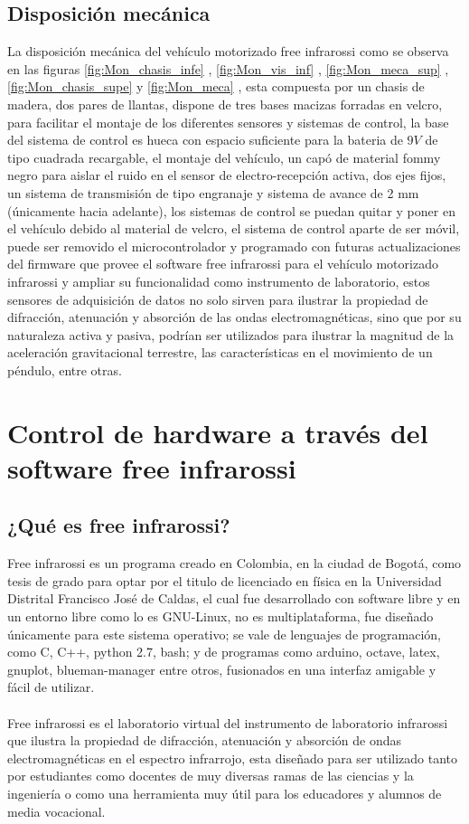 \documentclass[12]{article}
\begin{document}
\begin{multicols}{2}
\subsection{Disposición mecánica}
La disposición mecánica del vehículo motorizado free infrarossi como se observa en las figuras \ref{fig:Mon_chasis_infe} ,  \ref{fig:Mon_vis_inf} , \ref{fig:Mon_meca_sup} , \ref{fig:Mon_chasis_supe} y \ref{fig:Mon_meca} , esta compuesta por un chasis de madera, dos pares de llantas, dispone de tres bases macizas forradas en velcro, para facilitar el montaje de los diferentes sensores y sistemas de control, la base del sistema de control es hueca con espacio suficiente para la bateria de $9 V$ de tipo cuadrada recargable, el montaje del vehículo,  un capó de material fommy negro para aislar el ruido en el sensor de electro-recepción activa,  dos ejes fijos, un sistema de transmisión de tipo engranaje y sistema de avance de 2 mm (únicamente  hacia adelante), los sistemas de control se puedan quitar y poner en el vehículo debido al material de velcro, el sistema de control aparte de ser móvil, puede  ser removido el microcontrolador y programado con futuras actualizaciones del firmware que provee el software free infrarossi para el vehículo motorizado infrarossi y ampliar su funcionalidad como instrumento de laboratorio, estos sensores de adquisición de datos  no solo sirven para ilustrar la propiedad de difracción, atenuación y absorción de las ondas electromagnéticas, sino que por su naturaleza activa y pasiva, podrían ser utilizados para  ilustrar la magnitud de la  aceleración gravitacional terrestre, las características en el  movimiento de un péndulo, entre otras. 
\section{Control de hardware a través del software free infrarossi}
\subsection{¿Qué es free infrarossi?}
Free infrarossi es un  programa creado en Colombia, en la ciudad de Bogotá, como tesis de grado para optar por el titulo de licenciado en física en la Universidad Distrital Francisco José de Caldas, el cual fue desarrollado con software libre y en un entorno libre como lo es GNU-Linux, no es multiplataforma, fue diseñado únicamente para este sistema operativo; se vale de lenguajes de programación, como  C, C++, python 2.7, bash; y de programas como arduino, octave, latex, gnuplot, blueman-manager entre otros, fusionados en una interfaz amigable y fácil de utilizar. \\\\
Free infrarossi es el laboratorio virtual del instrumento de laboratorio infrarossi  que ilustra  la propiedad de difracción, atenuación y absorción de ondas electromagnéticas en el espectro infrarrojo, esta diseñado para ser utilizado tanto por  estudiantes como docentes de muy diversas ramas de las ciencias y  la ingeniería o como una herramienta muy útil para los educadores y alumnos de media vocacional.

\end{multicols}
\end{document}
